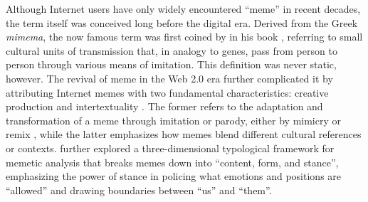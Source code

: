 \documentclass[12pt,twoside]{article}
\begin{document}

Although Internet users have only widely encountered ``meme'' in recent decades, the term itself was conceived long before the digital era. Derived from the Greek \textit{mimema}, the now famous term was first coined by \textcite{dawkins1976selfishgene} in his book , referring to small cultural units of transmission that, in analogy to genes, pass from person to person through various means of imitation. This definition was never static, however. The revival of meme in the Web 2.0 era further complicated it by attributing Internet memes with two fundamental characteristics: creative production and intertextuality \parencite{shifman2013memesdigitalculture}. The former refers to the adaptation and transformation of a meme through imitation or parody, either by mimicry or remix \parencite[20]{shifman2013memesdigitalculture}, while the latter emphasizes
how memes blend different cultural references or contexts. \textcite{shifman2013memesdigitalworld} further explored a three-dimensional typological framework for memetic analysis that breaks memes down into ``content, form, and stance'', emphasizing the power of stance in policing what emotions and positions are ``allowed'' and drawing boundaries between ``us'' and ``them''. 
 
\end{document}
